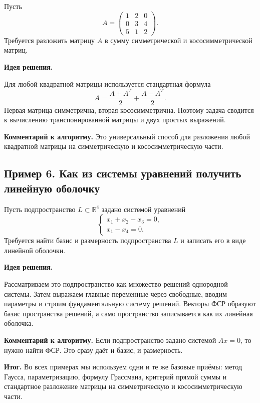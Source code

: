 Пусть
\[
A=
\begin{pmatrix}
1&2&0\\
0&3&4\\
5&1&2
\end{pmatrix}.
\]
Требуется разложить матрицу $A$ в сумму симметрической и кососимметрической матриц.

\textbf{Идея решения.}

Для любой квадратной матрицы используется стандартная формула
\[
A=\frac{A+A^T}{2}+\frac{A-A^T}{2}.
\]
Первая матрица симметрична, вторая кососимметрична. Поэтому задача сводится к вычислению транспонированной матрицы и двух простых выражений.

\medskip
\noindent
\textbf{Комментарий к алгоритму.}
Это универсальный способ для разложения любой квадратной матрицы на симметрическую и кососимметрическую части.

\subsection*{Пример 6. Как из системы уравнений получить линейную оболочку}

Пусть подпространство $L \subset \mathbb R^4$ задано системой уравнений
\[
\begin{cases}
x_1+x_2-x_3=0,\\
x_1-x_4=0.
\end{cases}
\]
Требуется найти базис и размерность подпространства $L$ и записать его в виде линейной оболочки.

\textbf{Идея решения.}

Рассматриваем это подпространство как множество решений однородной системы. Затем выражаем главные переменные через свободные, вводим параметры и строим фундаментальную систему решений. Векторы ФСР образуют базис пространства решений, а само пространство записывается как их линейная оболочка.

\medskip
\noindent
\textbf{Комментарий к алгоритму.}
Если подпространство задано системой $Ax=0$, то нужно найти ФСР. Это сразу даёт и базис, и размерность.

\medskip
\noindent
\textbf{Итог.}
Во всех примерах мы используем одни и те же базовые приёмы: метод Гаусса, параметризацию, формулу Грассмана, критерий прямой суммы и стандартное разложение матрицы на симметрическую и кососимметрическую части.
